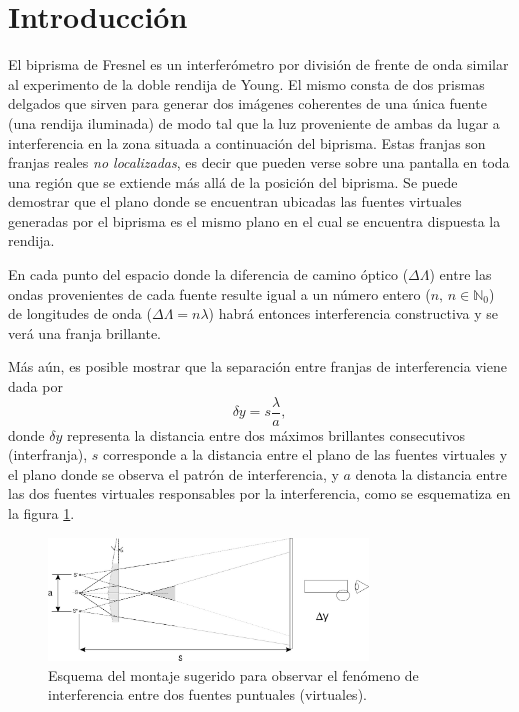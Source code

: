 \documentclass[laboratorio]{guia}
\begin{document}
\maketitle


\section{Introducción}

El biprisma de Fresnel es un interferómetro por división de frente de onda similar al experimento de la doble rendija de Young.
El mismo consta de dos prismas delgados que sirven para generar dos imágenes coherentes de una única fuente (una rendija iluminada) de modo tal que la luz proveniente de ambas da lugar a interferencia en la zona situada a continuación del biprisma.
Estas franjas son franjas reales \emph{no localizadas}, es decir que pueden verse sobre una pantalla en toda una región que se extiende más allá de la posición del biprisma.
Se puede demostrar que el plano donde se encuentran ubicadas las fuentes virtuales generadas por el biprisma es el mismo plano en el cual se encuentra dispuesta la rendija. 

En cada punto del espacio donde la diferencia de camino óptico (\(\Delta \Lambda\)) entre las ondas provenientes de cada fuente resulte igual a un número entero (\(n,\, n \in \mathbb{N}_0\)) de longitudes de onda (\(\Delta \Lambda= n \lambda\)) habrá entonces interferencia constructiva y se verá una franja brillante. 

Más aún, es posible mostrar que la separación entre franjas de interferencia viene dada por
\begin{equation}
    \delta y = s \frac{\lambda}{a},
    \label{eq:1}
\end{equation}
donde \(\delta y\) representa la distancia entre dos máximos brillantes consecutivos (interfranja), \(s\) corresponde a la distancia entre el plano de las fuentes virtuales y el plano donde se observa el patrón de interferencia, y \(a\) denota la distancia entre las dos fuentes virtuales responsables por la interferencia, como se esquematiza en la figura \ref{fig:biprisma}.

\begin{figure}[ht]
    \centering
    \includegraphics[width=8.5cm]{LG09--000.png}
    \caption{Esquema del montaje sugerido para observar el fenómeno de interferencia entre dos fuentes puntuales (virtuales).}
    \label{fig:biprisma}
\end{figure}
\end{document}
